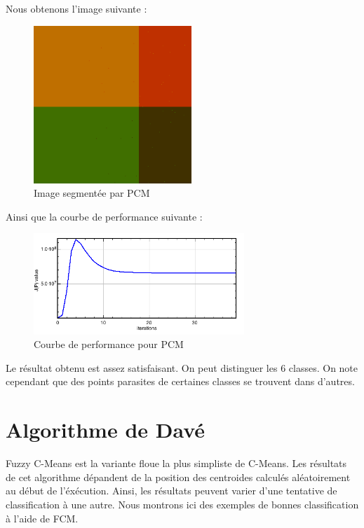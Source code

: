 \documentclass[a4paper,11pt]{article}
\begin{document}
Nous obtenons l'image suivante :

\begin{figure}[H]
\begin{center}
\includegraphics[width=225px]{../img/PCM.png}
\end{center}
\caption{Image segmentée par PCM}
\end{figure}

Ainsi que la courbe de performance suivante :

\begin{figure}[H]
\begin{center}
\includegraphics[width=300px]{../img/Perf_PCM.png}
\end{center}
\caption{Courbe de performance pour PCM}
\end{figure}

Le résultat obtenu est assez satisfaisant. On peut distinguer les 6 classes. On note cependant que des points parasites de certaines classes se trouvent dans d'autres.

\section{Algorithme de Davé}
Fuzzy C-Means est la variante floue la plus simpliste de C-Means. Les résultats de cet algorithme dépandent de la position des centroides calculés aléatoirement au début de l'éxécution. Ainsi, les résultats peuvent varier d'une tentative de classification à une autre. Nous montrons ici des exemples de bonnes classification à l'aide de FCM.
\end{document}
